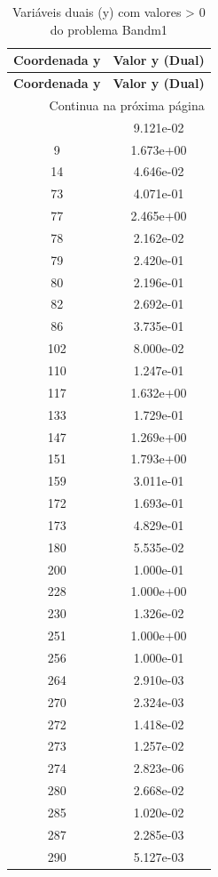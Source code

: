 \documentclass[12pt]{article}
\begin{document}
\begin{longtable}{@{}cc@{}}
\caption{Variáveis duais (y) com valores > 0 do problema Bandm1} \\
\toprule
\textbf{Coordenada y} & \textbf{Valor y (Dual)} \\
\midrule
\endfirsthead

\toprule
\textbf{Coordenada y} & \textbf{Valor y (Dual)} \\
\midrule
\endhead

\midrule \multicolumn{2}{r}{{Continua na próxima página}} \\ \midrule
\endfoot

\bottomrule
\endlastfoot
5 & 9.121e-02 \\
9 & 1.673e+00 \\
14 & 4.646e-02 \\
73 & 4.071e-01 \\
77 & 2.465e+00 \\
78 & 2.162e-02 \\
79 & 2.420e-01 \\
80 & 2.196e-01 \\
82 & 2.692e-01 \\
86 & 3.735e-01 \\
102 & 8.000e-02 \\
110 & 1.247e-01 \\
117 & 1.632e+00 \\
133 & 1.729e-01 \\
147 & 1.269e+00 \\
151 & 1.793e+00 \\
159 & 3.011e-01 \\
172 & 1.693e-01 \\
173 & 4.829e-01 \\
180 & 5.535e-02 \\
200 & 1.000e-01 \\
228 & 1.000e+00 \\
230 & 1.326e-02 \\
251 & 1.000e+00 \\
256 & 1.000e-01 \\
264 & 2.910e-03 \\
270 & 2.324e-03 \\
272 & 1.418e-02 \\
273 & 1.257e-02 \\
274 & 2.823e-06 \\
280 & 2.668e-02 \\
285 & 1.020e-02 \\
287 & 2.285e-03 \\
290 & 5.127e-03 \\

\bottomrule
\end{longtable}
\end{document}
